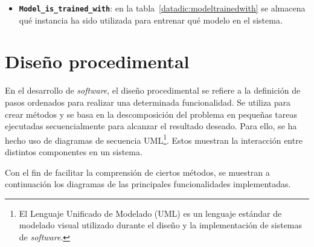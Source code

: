 \begin{itemize}
	\item \textbf{\texttt{Model\_is\_trained\_with}}: en la tabla~\ref{datadic:modeltrainedwith} se almacena qué instancia ha sido utilizada para entrenar qué modelo en el sistema.
	
		\begin{table}
		\caption[Diccionario de datos: \texttt{Model\_is\_trained\_with}]{Diccionario de datos: tabla correspondiente a la clase \texttt{Model\_is\_trained\_with}.}
		\label{datadic:modeltrainedwith}
	\end{table}
\end{itemize}


\section{Diseño procedimental}
\label{s:diseño-procedimental}

En el desarrollo de \textit{software}, el diseño procedimental se refiere a la definición de pasos ordenados para realizar una determinada funcionalidad. Se utiliza para crear métodos y se basa en la descomposición del problema en pequeñas tareas ejecutadas secuencialmente para alcanzar el resultado deseado. Para ello, se ha hecho uso de diagramas de secuencia UML\footnote{El Lenguaje Unificado de Modelado (UML) es un lenguaje estándar de modelado visual utilizado durante el diseño y la implementación de sistemas de \textit{software}.}. Estos muestran la interacción entre distintos componentes en un sistema.

Con el fin de facilitar la comprensión de ciertos métodos, se muestran a continuación los diagramas de las principales funcionalidades implementadas.

